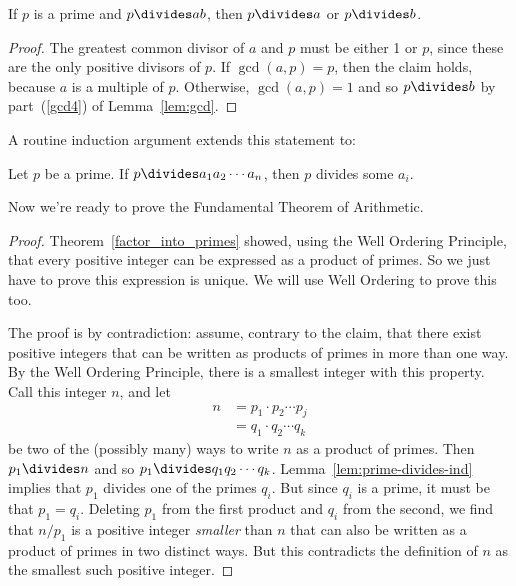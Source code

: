 \begin{lemma}
\label{lem:prime-divides}
If $p$ is a prime and $p \divides ab$, then $p \divides a$ or $p \divides b$.
\end{lemma}

\begin{proof}
The greatest common divisor of $a$ and $p$ must be either 1 or $p$,
since these are the only positive divisors of $p$.  If $\gcd(a, p) =
p$, then the claim holds, because $a$ is a multiple of $p$.
Otherwise, $\gcd(a, p) = 1$ and so $p \divides b$ by part~(\ref{gcd4})
of Lemma~\ref{lem:gcd}.
\end{proof}

A routine induction argument extends this statement to:\iffalse the fact
we assumed last time:\fi

\begin{lemma}
\label{lem:prime-divides-ind}
Let $p$ be a prime.  If $p \divides a_1 a_2 \cdots a_n$, then $p$ divides
some $a_i$.
\end{lemma}

Now we're ready to prove the Fundamental Theorem of Arithmetic.
\begin{proof}
Theorem~\ref{factor_into_primes} showed, using the Well Ordering
Principle, that every positive integer can be expressed as a product
of primes.  So we just have to prove this expression is unique.  We
will use Well Ordering to prove this too.

\iffalse
First, we use strong induction to prove that every positive integer
$n$ is a product of primes.  As a base case, $n = 1$ is the product of
the empty set of primes.  For the inductive step, suppose that every
$k < n$ is a product of primes.  We must show that $n$ is also a
product of primes.  If $n$ is itself prime, then this is true
trivially.  Otherwise, $n = a b$ for some $a, b < n$.  By the
induction assumption, $a$ and $b$ are both products of primes.
Therefore, $a \cdot b = n$ is also a product of primes.  Thus, the
claim is proved by induction.
\fi

The proof is by contradiction: assume, contrary to the claim, that there
exist positive integers that can be written as products of primes in more
than one way.  By the Well Ordering Principle, there is a smallest integer
with this property.  Call this integer $n$, and let
%
\begin{align*}
n & = p_1 \cdot p_2 \cdots p_j \\
  & = q_1 \cdot q_2 \cdots q_k
\end{align*}
%
be two of the (possibly many) ways to write $n$ as a product of
primes.  Then $p_1 \divides n$ and so $p_1 \divides q_1 q_2 \cdots q_k$.
Lemma~\ref{lem:prime-divides-ind} implies that $p_1$ divides one of
the primes $q_i$.  But since $q_i$ is a prime, it must be that $p_1 =
q_i$.  Deleting $p_1$ from the first product and $q_i$ from the
second, we find that $n / p_1$ is a positive integer \emph{smaller}
than $n$ that can also be written as a product of primes in two
distinct ways.  But this contradicts the definition of $n$ as the
smallest such positive integer.
\end{proof}

